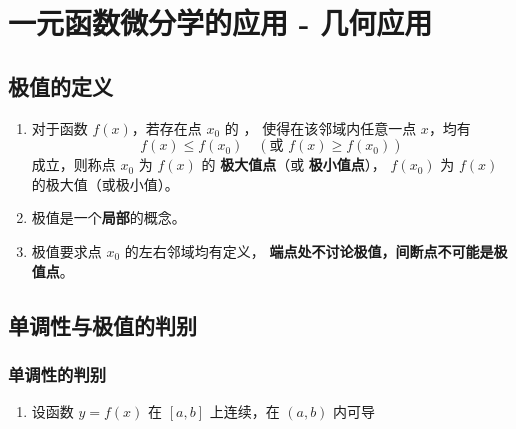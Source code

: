 \documentclass[a4paper,12pt]{article}
\newcommand{\blueuline}[1]{{\color{blue}\uline{\color{black}{#1}}}}
\begin{document}



    \section{一元函数微分学的应用 - 几何应用}

    \subsection{极值的定义}
    \begin{enumerate}
        \item 对于函数 $f(x)$，若存在点 $x_0$ 的 {\color{red}{某个邻域}}，
        使得在该邻域内任意一点 $x$，均有
        \[
            f(x) \le f(x_0)\quad (\text{或 } f(x) \ge f(x_0))
        \]
        成立，则称点 $x_0$ 为 $f(x)$ 的
        \textbf{极大值点}（或 \textbf{极小值点}），
        $f(x_0)$ 为 $f(x)$ 的极大值（或极小值）。

        \item 极值是一个\textbf{局部}的概念。

        \item 极值要求点 $x_0$ 的左右邻域均有定义，
        \textbf{端点处不讨论极值，间断点不可能是极值点}。
    \end{enumerate}

    \subsection{单调性与极值的判别}

    \subsubsection{单调性的判别}
    \begin{enumerate}
        \item 设函数 $y = f(x)$ 在 $[a,b]$ 上连续，在 $(a,b)$ 内可导

    \end{enumerate}
\end{document}

